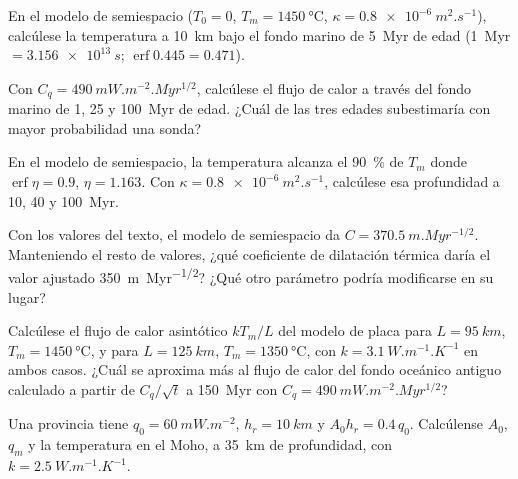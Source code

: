 \begin{exercise}[$\star$]\label{exo:b3:lithosphere-thermal-models:3}
En el modelo de semiespacio ($T_0 = 0$, $T_m = \qty{1450}{\celsius}$, $\kappa =
\qty{0.8e-6}{m^2.s^{-1}}$), calcúlese la temperatura a \qty{10}{km} bajo el fondo
marino de \qty{5}{Myr} de edad (\qty{1}{Myr} $= \qty{3.156e13}{s}$; $\operatorname{erf}
0.445 = 0.471$).
\end{exercise}

\begin{exercise}[$\star$]\label{exo:b3:lithosphere-thermal-models:4}
Con $C_q = \qty{490}{mW.m^{-2}.Myr^{1/2}}$, calcúlese el flujo de calor a través del
fondo marino de 1, 25 y \qty{100}{Myr} de edad. ¿Cuál de las tres edades subestimaría
con mayor probabilidad una sonda?
\end{exercise}

\begin{exercise}[$\star\star$]\label{exo:b3:lithosphere-thermal-models:5}
En el modelo de semiespacio, la temperatura alcanza el \qty{90}{\percent} de $T_m$
donde $\operatorname{erf}\eta = 0.9$, $\eta = 1.163$. Con $\kappa =
\qty{0.8e-6}{m^2.s^{-1}}$, calcúlese esa profundidad a 10, 40 y \qty{100}{Myr}.
\end{exercise}

\begin{exercise}[$\star\star$]\label{exo:b3:lithosphere-thermal-models:6}
Con los valores del texto, el modelo de semiespacio da $C =
\qty{370.5}{m.Myr^{-1/2}}$. Manteniendo el resto de valores, ¿qué coeficiente de dilatación térmica
daría el valor ajustado \qty{350}{m.Myr^{-1/2}}? ¿Qué otro parámetro
podría modificarse en su lugar?
\end{exercise}

\begin{exercise}[$\star\star$]\label{exo:b3:lithosphere-thermal-models:7}
Calcúlese el flujo de calor asintótico $kT_m/L$ del modelo de placa para $L =
\qty{95}{km}$, $T_m = \qty{1450}{\celsius}$, y para $L = \qty{125}{km}$,
$T_m = \qty{1350}{\celsius}$, con $k = \qty{3.1}{W.m^{-1}.K^{-1}}$ en ambos casos.
¿Cuál se aproxima más al flujo de calor del fondo oceánico antiguo calculado a partir de $C_q/\sqrt t$
a \qty{150}{Myr} con $C_q = \qty{490}{mW.m^{-2}.Myr^{1/2}}$?
\end{exercise}

\begin{exercise}[$\star\star$]\label{exo:b3:lithosphere-thermal-models:8}
Una provincia tiene $q_0 = \qty{60}{mW.m^{-2}}$, $h_r = \qty{10}{km}$ y $A_0h_r =
0.4\,q_0$. Calcúlense $A_0$, $q_m$ y la temperatura en el Moho, a \qty{35}{km}
de profundidad, con $k = \qty{2.5}{W.m^{-1}.K^{-1}}$.
\end{exercise}

